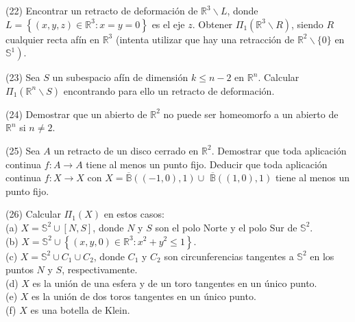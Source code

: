 \documentclass[
  a4paper,
  spanish,
  12pt,
]{scrartcl}
\begin{document}
\begin{ejer}
(22) Encontrar un retracto de deformación de $\mathbb{R}^{3} \backslash L$, donde $L=\left\{(x, y, z) \in \mathbb{R}^{3}: x=y=0\right\}$ es el eje $z$. Obtener $\Pi_{1}\left(\mathbb{R}^{3} \backslash R\right)$, siendo $R$ cualquier recta afín en $\mathbb{R}^{3}$ (intenta utilizar que hay una retracción de $\mathbb{R}^{2} \backslash\{0\}$ en $\left.\mathbb{S}^{1}\right)$.\\
\end{ejer}

\begin{ejer}
(23) Sea $S$ un subespacio afín de dimensión $k \leq n-2$ en $\mathbb{R}^{n}$. Calcular $\Pi_{1}\left(\mathbb{R}^{n} \backslash S\right)$ encontrando para ello un retracto de deformación.\\
\end{ejer}

\begin{ejer}
(24) Demostrar que un abierto de $\mathbb{R}^{2}$ no puede ser homeomorfo a un abierto de $\mathbb{R}^{n}$ si $n \neq 2$.\\
\end{ejer}

\begin{ejer}
(25) Sea $A$ un retracto de un disco cerrado en $\mathbb{R}^{2}$. Demostrar que toda aplicación continua $f: A \rightarrow A$ tiene al menos un punto fijo. Deducir que toda aplicación continua $f: X \rightarrow X$ con $X=\overline{\mathbb{B}}((-1,0), 1) \cup$ $\overline{\mathbb{B}}((1,0), 1)$ tiene al menos un punto fijo.\\
\end{ejer}

\begin{ejer}
(26) Calcular $\Pi_{1}(X)$ en estos casos:\\
(a) $X=\mathbb{S}^{2} \cup[N, S]$, donde $N$ y $S$ son el polo Norte y el polo Sur de $\mathbb{S}^{2}$.\\
(b) $X=\mathbb{S}^{2} \cup\left\{(x, y, 0) \in \mathbb{R}^{3}: x^{2}+y^{2} \leq 1\right\}$.\\
(c) $X=\mathbb{S}^{2} \cup C_{1} \cup C_{2}$, donde $C_{1}$ y $C_{2}$ son circunferencias tangentes a $\mathbb{S}^{2}$ en los puntos $N$ y $S$, respectivamente.\\
(d) $X$ es la unión de una esfera y de un toro tangentes en un único punto.\\
(e) $X$ es la unión de dos toros tangentes en un único punto.\\
(f) $X$ es una botella de Klein.\\
\end{ejer}
\end{document}
